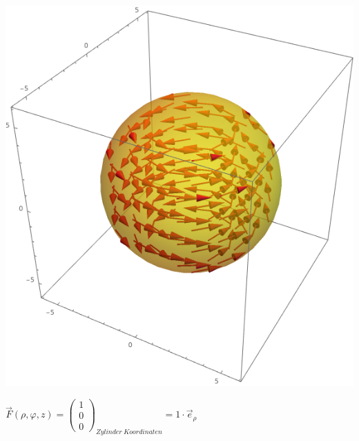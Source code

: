					\formulaEnd
					\begin{center}

					\includegraphics[scale=0.4]{spherical_phi.png}

					\end{center}









					\formulaBegin
						$\vec{F}(\rho, \varphi, z) = \left(\begin{array}{c} 1 \\ 0 \\ 0 \end{array}\right)_{Zylinder\ Koordinaten} = 1 \cdot \vec{e}_\rho$ \\

